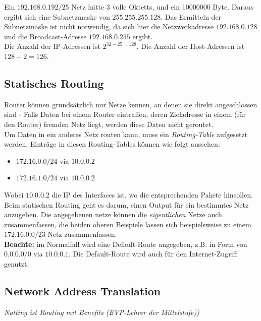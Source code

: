 \documentclass[a4paper, 12pt]{report}
\begin{document}
Ein $192.168.0.192/25$ Netz hätte 3 volle Oktetts, und ein 10000000 Byte. Daraus
ergibt sich eine Subnetzmaske von $255.255.255.128$. Das Ermitteln der
Subnetzmaske ist nicht notwendig, da sich hier die Netzwerkadresse
$192.168.0.128$ und die Broadcast-Adresse $192.168.0.255$ ergibt. \\

Die Anzahl der IP-Adressen ist $2^{32-25 = 128}$. Die Anzahl der Host-Adressen
ist $128 - 2 = 126$.

\subsection{Statisches Routing}

Router können grundsätzlich nur Netze kennen, an denen sie direkt angeschlossen
sind - Falls Daten bei einem Router eintraffen, deren Zieladresse in einem (für
den Router) fremden Netz liegt, werden diese Daten nicht geroutet. \\

Um Daten in ein anderes Netz routen kann, muss ein \emph{Routing-Table}
aufgesetzt werden. Einträge in diesen Routing-Tables können wie folgt aussehen:

\begin{itemize}
    \item $172.16.0.0/24$ via $10.0.0.2$
    \item $172.16.1.0/24$ via $10.0.0.2$
\end{itemize}

Wobei $10.0.0.2$ die IP des Interfaces ist, wo die entsprechenden Pakete
hinsollen. Beim statischen Routing geht es darum, einen Output für ein
bestimmtes Netz anzugeben. Die angegebenen netze können die \emph{eigentlichen}
Netze auch zusammenfassen, die beiden oberen Beispiele lassen sich
beispielsweise zu einem $172.16.0.0/23$ Netz zusammenfassen. \\

\textbf{Beachte:} im Normalfall wird eine Default-Route angegeben, z.B. in Form
von $0.0.0.0/0$ via $10.0.0.1$. Die Default-Route wird auch für den
Internet-Zugriff genutzt.

\subsection{Network Address Translation}

\noindent \emph{Natting ist Routing mit Benefits (EVP-Lehrer der Mittelstufe))}\\
\end{document}
